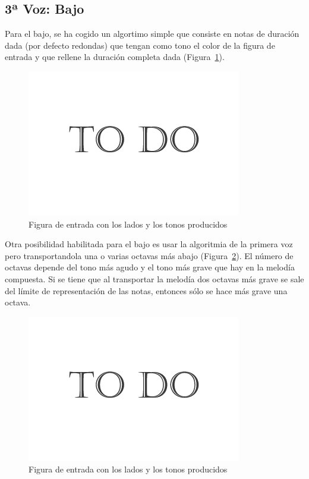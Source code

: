 \subsection{3ª Voz: Bajo}

Para el bajo, se ha cogido un algortimo simple que consiste en notas de duración dada (por defecto redondas) que tengan como tono el color de la figura de entrada y que rellene la duración completa dada (Figura~\ref{fig:Figura1Voz3}).

		\begin{figure}[htbp]
		\centering
		\hspace*{0.0in}
		\includegraphics[scale=0.57]{graphics/todo.png}
		\caption{Figura de entrada con los lados y los tonos producidos}
		\label{fig:Figura1Voz3}
		\end{figure}

Otra posibilidad habilitada para el bajo es usar la algoritmia de la primera voz pero transportandola una o varias octavas más abajo (Figura~\ref{fig:Figura2Voz3}). El número de octavas depende del tono más agudo y el tono más grave que hay en la melodía compuesta. Si se tiene que al transportar la melodía dos octavas más grave se sale del límite de representación de las notas, entonces sólo se hace más grave una octava.

		\begin{figure}[htbp]
		\centering
		\hspace*{0.0in}
		\includegraphics[scale=0.57]{graphics/todo.png}
		\caption{Figura de entrada con los lados y los tonos producidos}
		\label{fig:Figura2Voz3}
		\end{figure}

